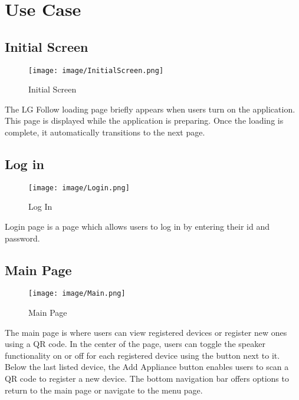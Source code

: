 \documentclass[conference]{IEEEtran}
\begin{document}
\section{Use Case}

\subsection{Initial Screen}
\begin{figure}[h!]
    \centering
    \texttt{[image: image/InitialScreen.png]}
    \caption{Initial Screen}
    \label{fig:enter-label}
\end{figure}

\noindent The LG Follow loading page briefly appears when users turn on the application. This page is displayed while the application is preparing. Once the loading is complete, it automatically transitions to the next page.\\


\subsection{Log in}
\begin{figure}[h!]
    \centering
    \texttt{[image: image/Login.png]}
    \caption{Log In}
    \label{fig:enter-label}
\end{figure}

\noindent Login page is a page which allows users to log in by entering their id and password.\\



\subsection{Main Page}

\begin{figure}[h!]
    \centering
    \texttt{[image: image/Main.png]}
    \caption{Main Page}
    \label{fig:enter-label}
\end{figure}

\noindent The main page is where users can view registered devices or register new ones using a QR code. In the center of the page, users can toggle the speaker functionality on or off for each registered device using the button next to it. Below the last listed device, the Add Appliance button enables users to scan a QR code to register a new device. The bottom navigation bar offers options to return to the main page or navigate to the menu page.\\
\end{document}
